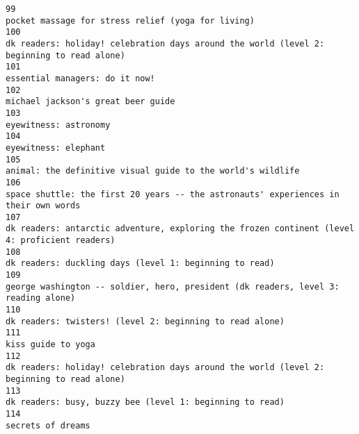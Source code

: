 \documentclass[
]{report}
\begin{document}
\begin{verbatim}
99                                                                                                                     pocket massage for stress relief (yoga for living)
100                                                                             dk readers: holiday! celebration days around the world (level 2: beginning to read alone)
101                                                                                                                                        essential managers: do it now!
102                                                                                                                                    michael jackson's great beer guide
103                                                                                                                                                 eyewitness: astronomy
104                                                                                                                                                  eyewitness: elephant
105                                                                                                           animal: the definitive visual guide to the world's wildlife
106                                                                                   space shuttle: the first 20 years -- the astronauts' experiences in their own words
107                                                                         dk readers: antarctic adventure, exploring the frozen continent (level 4: proficient readers)
108                                                                                                                dk readers: duckling days (level 1: beginning to read)
109                                                                                    george washington -- soldier, hero, president (dk readers, level 3: reading alone)
110                                                                                                              dk readers: twisters! (level 2: beginning to read alone)
111                                                                                                                                                    kiss guide to yoga
112                                                                             dk readers: holiday! celebration days around the world (level 2: beginning to read alone)
113                                                                                                              dk readers: busy, buzzy bee (level 1: beginning to read)
114                                                                                                                                                     secrets of dreams

\end{verbatim}
\end{document}

